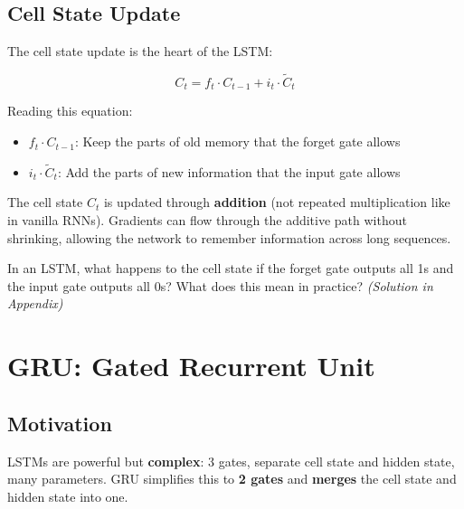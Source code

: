 \documentclass[11pt,a4paper]{article}
\begin{document}
\subsection{Cell State Update}

The cell state update is the heart of the LSTM:

\begin{equation}
\boxed{C_t = f_t \cdot C_{t-1} + i_t \cdot \tilde{C}_t}
\end{equation}

Reading this equation:
\begin{itemize}[leftmargin=1.5em]
    \item $f_t \cdot C_{t-1}$: Keep the parts of old memory that the forget gate allows
    \item $i_t \cdot \tilde{C}_t$: Add the parts of new information that the input gate allows
\end{itemize}

\begin{tcolorbox}[intuitionbox={Why This Solves Vanishing Gradients}]
The cell state $C_t$ is updated through \textbf{addition} (not repeated multiplication like in vanilla RNNs). Gradients can flow through the additive path without shrinking, allowing the network to remember information across long sequences.
\end{tcolorbox}

\begin{tcolorbox}[questionbox={Self-Check Q5}]
In an LSTM, what happens to the cell state if the forget gate outputs all 1s and the input gate outputs all 0s? What does this mean in practice? \textit{(Solution in Appendix)}
\end{tcolorbox}

\section{GRU: Gated Recurrent Unit}

\subsection{Motivation}

LSTMs are powerful but \textbf{complex}: 3 gates, separate cell state and hidden state, many parameters. GRU simplifies this to \textbf{2 gates} and \textbf{merges} the cell state and hidden state into one.
\end{document}
